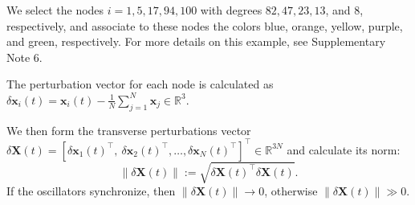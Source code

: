 \documentclass[%
 reprint,
 amsmath,amssymb,
 aip,
]{revtex4-2}
\def \bx {\pmb{x}}
\def \bX {\pmb{X}}
\def \bb {\pmb{b}}
\theoremstyle{italichead}
\theoremstyle{definition}
\begin{document}
{
We select the nodes $i = 1,5,17,94,100$ 
with degrees $82, 47, 23, 13$, and $8$, respectively, and associate to these nodes the colors blue, orange, yellow, purple, and green, respectively. 
For more details on this example, see Supplementary Note 6.

The perturbation vector for each node is calculated as $\delta \bx_i(t) = \bx_i (t) - \frac{1}{N} \sum_{j = 1}^N \bx_j \in \mathbb{R}^3$. 

We then form the transverse perturbations vector $\delta \bX(t) = [\delta \bx_1(t)^\top, \ \delta \bx_2(t)^\top, \hdots, \delta \bx_{N}(t)^\top]^\top \in \mathbb{R}^{3N}$ and calculate its norm:
\begin{equation} \label{eq:trans_synch}
    \| \delta \bX(t) \| := \sqrt{\delta \bX(t) ^\top \delta \bX(t)}.
\end{equation}
\color{black}
If the oscillators synchronize, then $\| \delta \bX(t) \| \to 0$, otherwise $\| \delta \bX(t) \| \gg 0$.

}
\end{document}
